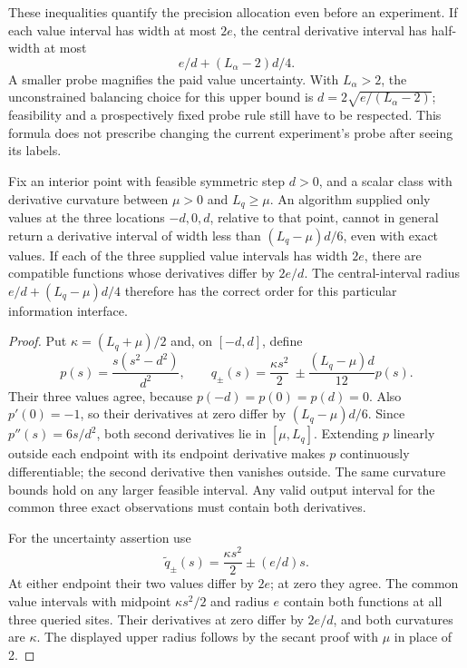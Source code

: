These inequalities quantify the precision allocation even
before an experiment.  If each value interval has width at
most \(2e\), the central derivative interval has half-width
at most
\[
 e/d+(L_\alpha-2)d/4.
\]
A smaller probe magnifies the paid value uncertainty.
With \(L_\alpha>2\), the unconstrained balancing choice for
this upper bound is \(d=2\sqrt{e/(L_\alpha-2)}\);
feasibility and a prospectively fixed probe rule still have
to be respected.  This formula does not prescribe changing
the current experiment's probe after seeing its labels.

\begin{proposition}
\label{prop:probelimit121}
Fix an interior point with feasible symmetric step \(d>0\),
and a scalar class with derivative curvature between
\(\mu>0\) and \(L_q\geq\mu\).
An algorithm supplied only values at the three locations
\(-d,0,d\), relative to that point, cannot in general return
a derivative interval of width less than
\((L_q-\mu)d/6\), even with exact values.
If each of the three supplied value intervals has width
\(2e\), there are compatible functions whose derivatives
differ by \(2e/d\).
The central-interval radius
\(e/d+(L_q-\mu)d/4\) therefore has the correct order for
this particular information interface.
\end{proposition}

\begin{proof}
Put \(\kappa=(L_q+\mu)/2\) and, on \([-d,d]\), define
\[
 p(s)=\frac{s(s^2-d^2)}{d^2},\qquad
 q_\pm(s)=\frac{\kappa s^2}{2}
              \ \pm\frac{(L_q-\mu)d}{12}p(s).
\]
Their three values agree, because \(p(-d)=p(0)=p(d)=0\).
Also \(p'(0)=-1\), so their derivatives at zero differ
by \((L_q-\mu)d/6\).
Since \(p''(s)=6s/d^2\), both second derivatives lie in
\([\mu,L_q]\).  Extending \(p\) linearly outside each
endpoint with its endpoint derivative makes \(p\)
continuously differentiable; the second derivative then
vanishes outside.  The same curvature bounds hold on any
larger feasible interval.  Any valid output interval for the
common three exact observations must contain both
derivatives.

For the uncertainty assertion use
\[
 \widetilde q_\pm(s)=\frac{\kappa s^2}{2}\pm(e/d)s.
\]
At either endpoint their two values differ by \(2e\);
at zero they agree.  The common value intervals with midpoint
\(\kappa s^2/2\) and radius \(e\) contain both functions at
all three queried sites.  Their derivatives at zero differ
by \(2e/d\), and both curvatures are \(\kappa\).
The displayed upper radius follows by the secant proof with
\(\mu\) in place of 2.
\end{proof}

